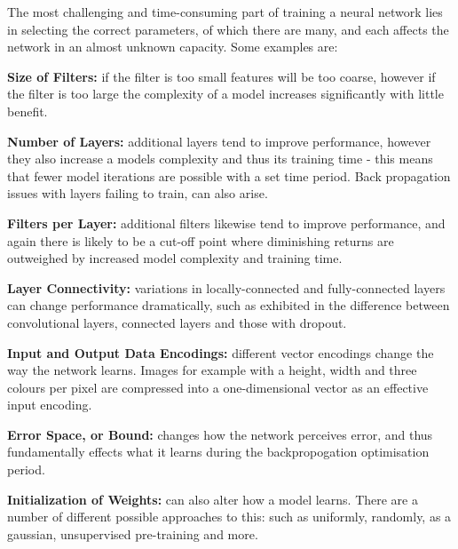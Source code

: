 \documentclass[a4paper,11pt,titlepage]{article}
\begin{document}
		\par 
		The most challenging and time-consuming part of training a neural network lies in selecting the correct parameters, of which there are many, and each affects the network in an almost unknown capacity. Some examples are:
		\par
		\textbf{Size of Filters:} if the filter is too small features will be too coarse, however if the filter is too large the complexity of a model increases significantly with little benefit.
		\par
		\textbf{Number of Layers:} additional layers tend to improve performance, however they also increase a models complexity and thus its training time - this means that fewer model iterations are possible with a set time period. Back propagation issues with layers failing to train, can also arise.
		\par 
		\textbf{Filters per Layer:} additional filters likewise tend to improve performance, and again there is likely to be a cut-off point where diminishing returns are outweighed by increased model complexity and training time.
		\par  
		\textbf{Layer Connectivity:} variations in locally-connected and fully-connected layers can change performance dramatically, such as exhibited in the difference between convolutional layers, connected layers and those with dropout.
		\par 
		\textbf{Input and Output Data Encodings:} different vector encodings change the way the network learns. Images for example with a height, width and three colours per pixel are compressed into a one-dimensional vector as an effective input encoding.
		\par  		
		\textbf{Error Space, or Bound:} changes how the network perceives error, and thus fundamentally effects what it learns during the backpropogation optimisation period.
		\par		 		
		\textbf{Initialization of Weights:} can also alter how a model learns. There are a number of different possible approaches to this: such as uniformly, randomly, as a gaussian, unsupervised pre-training and more.
		
\end{document}
